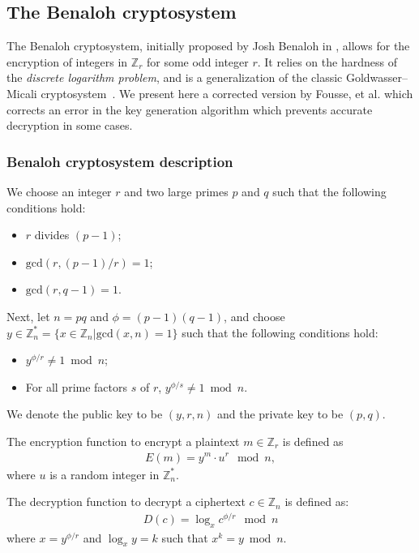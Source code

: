 \subsection{The Benaloh cryptosystem}
The Benaloh cryptosystem, initially proposed by Josh Benaloh in \cite{benaloh_dense_1994}, allows for the encryption of integers in $\mathbb{Z}_r$ for some odd integer $r$. It relies on the hardness of the \textit{discrete logarithm problem}, and is a generalization of the classic Goldwasser--Micali cryptosystem~\cite{goldwasser_probabilistic_1984}. We present here a corrected version by Fousse, et al. \cite{fousse_benalohs_2010} which corrects an error in the key generation algorithm which prevents accurate decryption in some cases.

\subsubsection{Benaloh cryptosystem description}
We choose an integer $r$ and two large primes $p$ and $q$ such that the following conditions hold:
\begin{itemize}
  \item $r$ divides $(p-1)$;
  \item $\mathrm{gcd}(r,(p-1)/r)=1$;
  \item $\mathrm{gcd}(r,q-1)=1$.
\end{itemize}
Next, let $n=pq$ and $\phi = (p-1)(q-1)$, and choose $y\in \mathbb{Z}_n^* = \{ x \in \mathbb{Z}_n | \mathrm{gcd}(x,n)=1 \}$ such that the following conditions hold:
\begin{itemize}
  \item $y^{\phi/r}\neq 1 \bmod n$;
  \item For all prime factors $s$ of $r$, $y^{\phi/s}\neq 1 \bmod n$.
\end{itemize}
We denote the public key to be $(y,r,n)$ and the private key to be $(p,q)$.

The encryption function to encrypt a plaintext $m \in \mathbb{Z}_r$ is defined as
\begin{align*}
  E(m) = y^m \cdot u^r \mod{n},
\end{align*}
where $u$ is a random integer in $\mathbb{Z}_n^*$.

The decryption function to decrypt a ciphertext $c \in \mathbb{Z}_{n}$ is defined as:
\begin{align*}
  D(c) = \log_x{c^{\phi/r}} \mod n
\end{align*}
where $x = y^{\phi/r}$ and $\log_x{y} = k$ such that $x^k = y \bmod n$.

